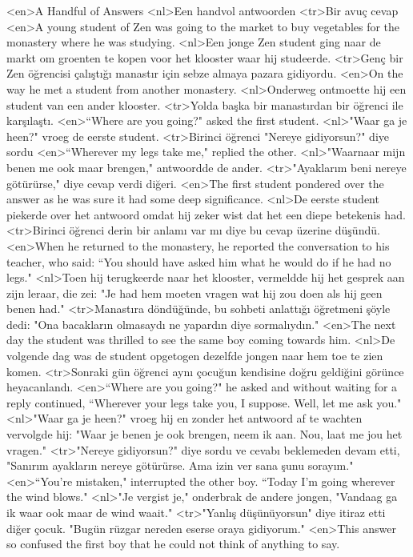 <en>A Handful of Answers
<nl>Een handvol antwoorden
<tr>Bir avuç cevap
<en>A young student of Zen was going to the market to buy vegetables for the monastery where he was studying.
<nl>Een jonge Zen student ging naar de markt om groenten te kopen voor het klooster waar hij studeerde.
<tr>Genç bir Zen öğrencisi çalıştığı manastır için sebze almaya pazara gidiyordu.
<en>On the way he met a student from another monastery.
<nl>Onderweg ontmoette hij een student van een ander klooster.
<tr>Yolda başka bir manastırdan bir öğrenci ile karşılaştı.
<en>“Where are you going?" asked the first student.
<nl>"Waar ga je heen?" vroeg de eerste student.
<tr>Birinci öğrenci "Nereye gidiyorsun?" diye sordu
<en>“Wherever my legs take me," replied the other.
<nl>"Waarnaar mijn benen me ook maar brengen," antwoordde de ander.
<tr>"Ayaklarım beni nereye götürürse," diye cevap verdi diğeri.
<en>The first student pondered over the answer as he was sure it had some deep significance.
<nl>De eerste student piekerde over het antwoord omdat hij zeker wist dat het een diepe betekenis had.
<tr>Birinci öğrenci derin bir anlamı var mı diye bu cevap üzerine düşündü.
<en>When he returned to the monastery, he reported the conversation to his teacher, who said: “You should have asked him what he would do if he had no legs."
<nl>Toen hij terugkeerde naar het klooster, vermeldde hij het gesprek aan zijn leraar, die zei: "Je had hem moeten vragen wat hij zou doen als hij geen benen had."
<tr>Manastıra döndüğünde, bu sohbeti anlattığı öğretmeni şöyle dedi: "Ona bacakların olmasaydı ne yapardın diye sormalıydın." 
<en>The next day the student was thrilled to see the same boy coming towards him.
<nl>De volgende dag was de student opgetogen dezelfde jongen naar hem toe te zien komen.
<tr>Sonraki gün öğrenci aynı çocuğun kendisine doğru geldiğini görünce heyacanlandı.
<en>“Where are you going?" he asked and without waiting for a reply continued, “Wherever your legs take you, I suppose. Well, let me ask you."
<nl>"Waar ga je heen?" vroeg hij en zonder het antwoord af te wachten vervolgde hij: "Waar je benen je ook brengen, neem ik aan. Nou, laat me jou het vragen."
<tr>"Nereye gidiyorsun?" diye sordu ve cevabı beklemeden devam etti, "Sanırım ayakların nereye götürürse. Ama izin ver sana şunu sorayım."
<en>“You’re mistaken," interrupted the other boy. “Today I’m going wherever the wind blows."
<nl>"Je vergist je," onderbrak de andere jongen, "Vandaag ga ik waar ook maar de wind waait."
<tr>"Yanlış düşünüyorsun" diye itiraz etti diğer çocuk. "Bugün rüzgar nereden eserse oraya gidiyorum."
<en>This answer so confused the first boy that he could not think of anything to say.
